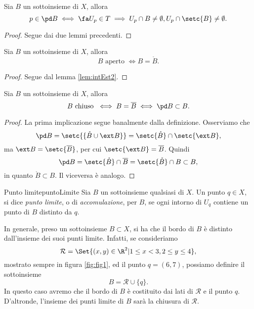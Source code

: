 \begin{lem}\label{lem:intEst4}
	Sia \(B\) un sottoinsieme di \(X\), allora
	\[
		p\in\pd B \iff \fa U_p\in T\implies U_p\cap B\neq\emptyset,U_p\cap \setc{B}\neq\emptyset.
	\]
\end{lem}

\begin{proof}
	Segue dai due lemmi precedenti.
\end{proof}

\begin{lem}\label{lem:intEst5}
	Sia \(B\) un sottoinsieme di \(X\), allora
	\[
		B\text{ aperto }\iff B=\mathring{B}.
	\]
\end{lem}

\begin{proof}
	Segue dal lemma \ref{lem:intEst2}.
\end{proof}

\begin{lem}\label{lem:intEst6}
	Sia \(B\) un sottoinsieme di \(X\), allora
	\[
		B\text{ chiuso }\iff B=\overline{B}\iff\pd B\subset B.
	\]
\end{lem}

\begin{proof}
	La prima implicazione segue banalmente dalla definizione.
	Osserviamo che
	\[
		\pd B=\setc{\{\mathring{B}\cup\ext B\}}=\setc{\mathring{B}}\cap\setc{\ext B},
	\]
	ma \(\ext B=\setc{\overline{B}}\), per cui \(\setc{\ext B}=\overline{B}\).
	Quindi
	\[
		\pd B=\setc{\mathring{B}}\cap \overline{B}=\setc{\mathring{B}}\cap B\subset B,
	\]
	in quanto \(\mathring{B}\subset B\).
	Il viceversa è analogo.
\end{proof}

\begin{defn}{Punto limite}{puntoLimite}
	Sia \(B\) un sottoinsieme qualsiasi di \(X\).
	Un punto \(q\in X\), si dice \emph{punto limite}, o di \emph{accomulazione}, per \(B\), se ogni intorno di \(U_q\) contiene un punto di \(B\) distinto da \(q\).
\end{defn}

\begin{oss}
	In generale, preso un sottoinsieme \(B\subset X\), si ha che il bordo di \(B\) è distinto dall'insieme dei suoi punti limite.
	Infatti, se consideriamo
	\[
		\mathcal{R}=\Set{(x,y)\in\R^2 | 1\le x<3,2\le y\le 4},
	\]
	mostrato sempre in figura \ref{fig:fig1}, ed il punto \(q=(6,7)\), possiamo definire il sottoinsieme
	\[
		B=\mathcal{R}\cup\{q\}.
	\]
	In questo caso avremo che il bordo di \(B\) è costituito dai lati di \(\mathcal{R}\) e il punto \(q\).
	D'altronde, l'insieme dei punti limite di \(B\) sarà la chiusura di \(\mathcal{R}\).
\end{oss}

